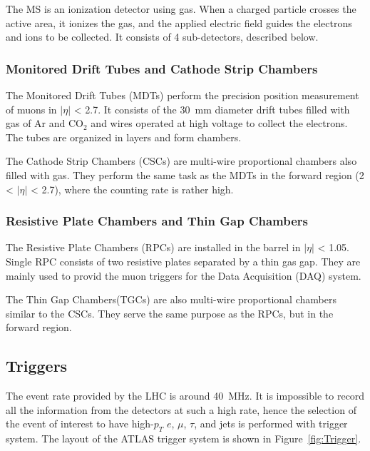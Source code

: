 The MS is an ionization detector using gas. When a charged particle crosses the active area, it ionizes the gas, and the applied electric field guides the electrons and ions to be collected. It consists of 4 sub-detectors, described below.

\subsubsection{Monitored Drift Tubes and Cathode Strip Chambers}
The Monitored Drift Tubes (MDTs) perform the precision position measurement of muons 
in $|\eta|$ < 2.7. It consists of the 30~mm diameter drift tubes filled with gas of Ar and CO$_2$ and wires operated at high voltage to collect the electrons.
The tubes are organized in layers and form chambers.

The Cathode Strip Chambers (CSCs) are multi-wire proportional chambers also filled with gas. They perform the same task as the MDTs in the forward region (2 < $|\eta|$ < 2.7), where the counting rate is rather high. 

\subsubsection{Resistive Plate Chambers and Thin Gap Chambers}
The Resistive Plate Chambers (RPCs) are installed in the barrel in  $|\eta|$ < 1.05. Single RPC consists of two resistive plates separated by a thin gas gap. They are mainly used to  provid the muon triggers for the Data Acquisition (DAQ) system.

The Thin Gap Chambers(TGCs) are also multi-wire proportional chambers similar to the CSCs. They serve the same purpose as the RPCs, but in the forward region. 

\subsection{Triggers}
The event rate provided by the LHC is around 40~MHz. It is impossible to record all the information from the detectors at such a high rate, hence the selection of the event of interest to have high-$p_T$ $e$, $\mu$, $\tau$, and jets is performed with trigger system. The layout of the ATLAS trigger system is shown in Figure~\ref{fig:Trigger}.


